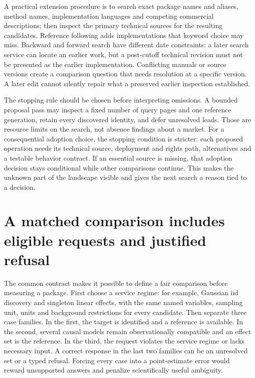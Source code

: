 A practical extension procedure is to search exact package names and aliases,
method names, implementation languages and competing commercial descriptions;
then inspect the primary technical sources for the resulting candidates.
Reference following adds implementations that keyword choice may miss.
Backward and forward search have different date constraints: a later search
service can locate an earlier work, but a post-cutoff technical revision must
not be presented as the earlier implementation. Conflicting manuals or
source versions create a comparison question that needs resolution at a
specific version. A later edit cannot silently repair what a preserved
earlier inspection established.

The stopping rule should be chosen before interpreting omissions. A bounded
proposal pass may inspect a fixed number of query pages and one reference
generation, retain every discovered identity, and defer unresolved leads.
Those are resource limits on the search, not absence findings about a market.
For a consequential adoption choice, the stopping condition is stricter:
each proposed operation needs its technical source, deployment and rights
path, alternatives and a testable behavior contract. If an essential source
is missing, that adoption decision stays conditional while other comparisons
continue. This makes the unknown part of the landscape visible and gives
the next search a reason tied to a decision.

\section{A matched comparison includes eligible requests and justified refusal}
\label{exec13:survey-comparison}

The common contract makes it possible to define a fair comparison before
measuring a package. First choose a service regime: for example, Gaussian
iid discovery and singleton linear effects, with the same named variables,
sampling unit, units and background restrictions for every candidate. Then
separate three case families. In the first, the target is identified and a
reference is available. In the second, several causal models remain
observationally compatible and an effect set is the reference. In the third,
the request violates the service regime or lacks necessary input. A correct
response in the last two families can be an unresolved set or a typed refusal.
Forcing every case into a point-estimate error would reward unsupported
answers and penalize scientifically useful ambiguity.

